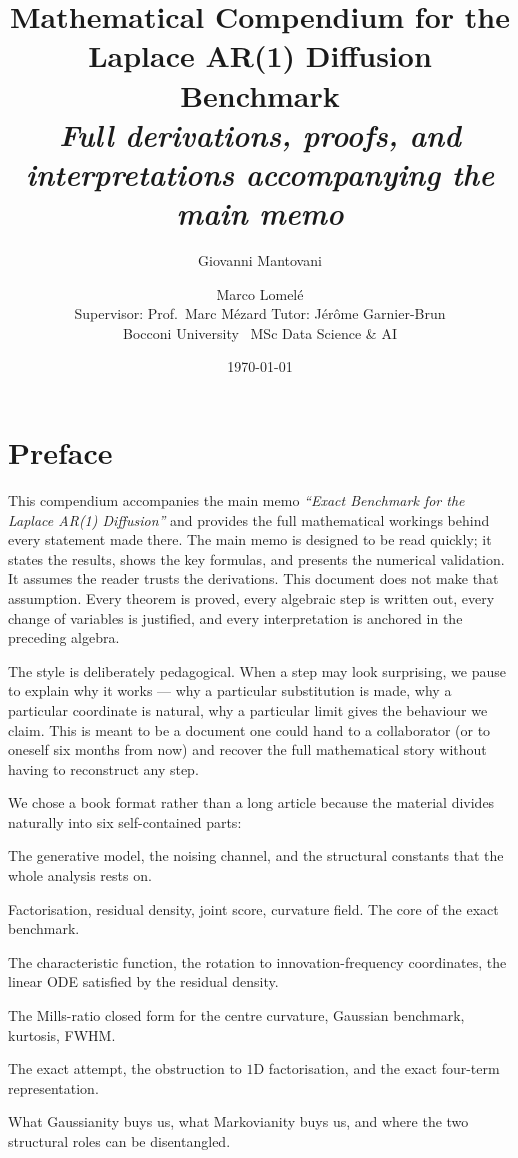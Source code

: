 \documentclass[11pt,a4paper,openany]{book}
\title{\bfseries Mathematical Compendium for the
Laplace AR(1) Diffusion Benchmark\\[4pt]
{\large\itshape Full derivations, proofs, and interpretations accompanying the
main memo}}
\author{Giovanni Mantovani \and Marco Lomel\'e \\[6pt]
\small Supervisor: Prof.\ Marc M\'ezard \quad Tutor: J\'er\^ome Garnier-Brun\\[2pt]
\small Bocconi University \textendash\ MSc Data Science \& AI}
\date{\today}
\theoremstyle{plainserif}
\theoremstyle{definition}
\theoremstyle{remarkstyle}
\begin{document}
\frontmatter
\maketitle

\chapter*{Preface}

This compendium accompanies the main memo
\emph{``Exact Benchmark for the Laplace AR(1) Diffusion''} and provides the
full mathematical workings behind every statement made there.
The main memo is designed to be read quickly; it states the results, shows
the key formulas, and presents the numerical validation. It assumes the
reader trusts the derivations.
This document does not make that assumption. Every theorem is proved,
every algebraic step is written out, every change of variables is justified,
and every interpretation is anchored in the preceding algebra.

The style is deliberately pedagogical. When a step may look surprising,
we pause to explain why it works --- why a particular substitution is made,
why a particular coordinate is natural, why a particular limit gives the
behaviour we claim. This is meant to be a document one could hand to a
collaborator (or to oneself six months from now) and recover the full
mathematical story without having to reconstruct any step.

We chose a book format rather than a long article because the material
divides naturally into six self-contained parts:

\begin{description}[leftmargin=1.5em,style=nextline]
\item[Part I --- Setting and foundations.]
  The generative model, the noising channel, and the structural constants
  that the whole analysis rests on.
\item[Part II --- The $K=1$ structure theorems.]
  Factorisation, residual density, joint score, curvature field. The
  core of the exact benchmark.
\item[Part III --- Fourier representation.]
  The characteristic function, the rotation to innovation-frequency
  coordinates, the linear ODE satisfied by the residual density.
\item[Part IV --- Scalar observables.]
  The Mills-ratio closed form for the centre curvature, Gaussian
  benchmark, kurtosis, FWHM.
\item[Part V --- The $K=2$ case.]
  The exact attempt, the obstruction to $1$D factorisation, and the
  exact four-term representation.
\item[Part VI --- Interpretation.]
  What Gaussianity buys us, what Markovianity buys us, and where the
  two structural roles can be disentangled.
\end{description}
\end{document}
